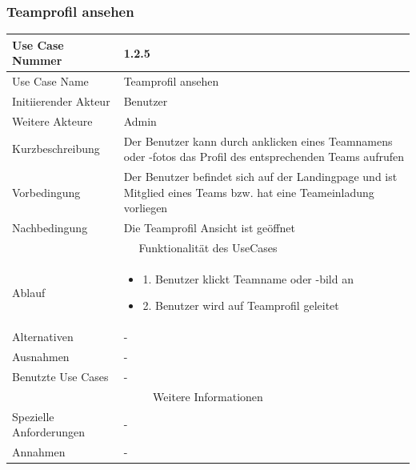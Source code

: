 \documentclass[10pt,a4paper]{article}
\begin{document}
		\subsubsection{Teamprofil ansehen}
		\begin{tabular}{|l|p{.5\linewidth}|}
			\hline Use Case Nummer & 1.2.5 \\ 
			\hline Use Case Name & Teamprofil ansehen \\ 
			\hline Initiierender Akteur & Benutzer \\
			\hline Weitere Akteure & Admin \\
			\hline Kurzbeschreibung & Der Benutzer kann durch anklicken eines Teamnamens oder -fotos das Profil des entsprechenden Teams aufrufen \\
			\hline Vorbedingung & Der Benutzer befindet sich auf der Landingpage und ist Mitglied eines Teams bzw. hat eine Teameinladung vorliegen \\
			\hline Nachbedingung & Die Teamprofil Ansicht ist geöffnet \\
			\hline \multicolumn{2}{|c|}{Funktionalität des UseCases}\\
			\hline Ablauf & \begin{itemize}
				\item 1. Benutzer klickt Teamname oder -bild an
				\item 2. Benutzer wird auf Teamprofil geleitet
			\end{itemize} \\
			\hline Alternativen & - \\
			\hline Ausnahmen & - \\
			\hline Benutzte Use Cases & - \\
			\hline \multicolumn{2}{|c|}{Weitere Informationen} \\
			\hline Spezielle Anforderungen & - \\
			\hline Annahmen & - \\
			\hline
		\end{tabular}
				
\end{document}
